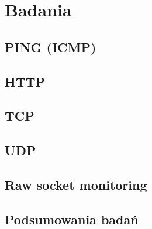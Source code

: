 \chapter[Badania.]{Badania}

\section{PING (ICMP)}

\section{HTTP}

\section{TCP}

\section{UDP}

\section{Raw socket monitoring}

\section{Podsumowania badań}
